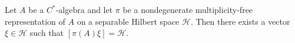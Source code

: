 Let $A$ be a $C^*$-algebra and let $\pi$ be a nondegenerate multiplicity-free representation of $A$ on a separable Hilbert space $\mathcal{H}$. Then there exists a vector $\xi \in \mathcal{H}$ such that $[\pi(A)\xi] = \mathcal{H}$.
